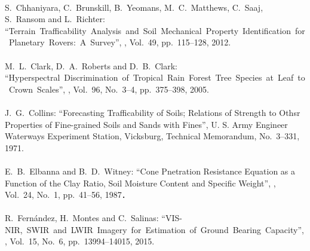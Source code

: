 \begin{mythebibliography}{}
\leavevmode \\S.~Chhaniyara, C.~Brunskill, B.~Yeomans, M.~C.~Matthews, C.~Saaj, S.~Ransom and L.~Richter:
\newblock ``Terrain~Trafficability~Analysis~and~Soil~Mechanical~Property~Identification~for~Planetary~Rovers:~A~Survey'',
, Vol.~49, pp.~115--128, 2012.
\\

\leavevmode \\M.~L.~Clark, D.~A.~Roberts and D.~B.~Clark:
\newblock ``Hyperspectral~Discrimination~of~Tropical~Rain~Forest~Tree~Species~at~Leaf~to~Crown~Scales'',
, Vol.~96, No.~3--4, pp.~375--398, 2005.
\\

\leavevmode \\J.~G.~Collins:
\newblock ``Forecasting Trafficability of Soils; Relations of Strength to Othsr Properties of Fine-grained Soils and Sands with Fines'',
\newblock U. S. Army Engineer Waterways Experiment Station, Vicksburg, Technical Memorandum, No.~3--331, 1971.
\\

\leavevmode \\E.~B.~Elbanna and B.~D.~Witney:
\newblock ``Cone Pnetration Resistance Equation as a Function of the Clay Ratio, Soil Moisture Content and Specific Weight'',
, Vol.~24, No.~1, pp.~41--56, 1987．
\\

\leavevmode \\R.~Fern\'andez, H.~Montes and C.~Salinas: 
\newblock ``VIS-NIR,~SWIR~and~LWIR~Imagery~for~Estimation~of~Ground~Bearing~Capacity'',
, Vol.~15, No.~6, pp.~13994--14015, 2015.
\\


\end{mythebibliography}
